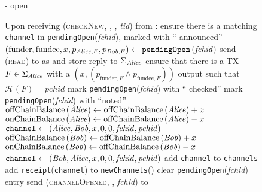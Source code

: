 \begin{figure}[H]
\begin{systembox}{\fpaynet - open}
\begin{algorithmic}[1]
        \State Upon receiving (\textsc{checkNew}, \alice, \bob, \textit{tid})
        from \alice:
        \Indent
          \State ensure there is a matching \texttt{channel} in
          \texttt{pendingOpen}(\textit{fchid}), marked with ``\alice{}
          announced''
          \label{alg:fpaynet:checkNew:valid}
          \State $\left(\mathrm{funder}, \mathrm{fundee}, x, p_{\mathit{Alice}, F},
          p_{\mathit{Bob}, F}\right) \gets
          \mathtt{pendingOpen}\left(\mathit{fchid}\right)$
          \State send (\textsc{read}) to \ledger{} as \alice{} and store reply
          to $\Sigma_{\mathit{Alice}}$
          \label{alg:fpaynet:checkNew:read}
          \State ensure that there is a TX $F \in \Sigma_{\mathit{Alice}}$ with a
          $\left(x, \left(p_{\mathrm{funder}, F} \wedge p_{\mathrm{fundee},
          F}\right)\right)$ output such that $\mathcal{H}\left(F\right) =
          \mathit{pchid}$
          \label{alg:fpaynet:checkNew:included}
          \State mark \texttt{pendingOpen}(\textit{fchid}) with ``\alice{}
          checked''
          \label{alg:fpaynet:checkNew:mark}
            \State mark \texttt{pendingOpen}(\textit{fchid}) with ``noted''
              \State $\mathrm{offChainBalance}\left(\mathit{Alice}\right) \gets
              \mathrm{offChainBalance}\left(\mathit{Alice}\right) + x$ 
              \State $\mathrm{onChainBalance}\left(\mathit{Alice}\right) \gets
              \mathrm{offChainBalance}\left(\mathit{Alice}\right) - x$
              \State $\mathtt{channel} \gets \left(\mathit{Alice}, \mathit{Bob}, x, 0, 0,
              \mathit{fchid}, \mathit{pchid}\right)$
            \Else {}
              \State $\mathrm{offChainBalance}\left(\mathit{Bob}\right) \gets
              \mathrm{offChainBalance}\left(\mathit{Bob}\right) + x$ 
              \State $\mathrm{onChainBalance}\left(\mathit{Bob}\right) \gets
              \mathrm{offChainBalance}\left(\mathit{Bob}\right) - x$
              \State $\mathtt{channel} \gets \left(\mathit{Bob}, \mathit{Alice}, x, 0, 0,
              \mathit{fchid}, \mathit{pchid}\right)$
            \EndIf
            \State add \texttt{channel} to \texttt{channels}
          \EndIf
          \State add \texttt{receipt}(\texttt{channel}) to
          \texttt{newChannels}(\alice)
            \State clear \texttt{pendingOpen}(\textit{fchid}) entry
          \EndIf
          \State send (\textsc{channelOpened}, \alice, \textit{fchid}) to
          \simulator
          \label{alg:fpaynet:checkNew:sim}
        \EndIndent
      \end{algorithmic}
    \end{systembox}
    \caption{}
    \label{alg:fpaynet:open}
  \end{figure}

